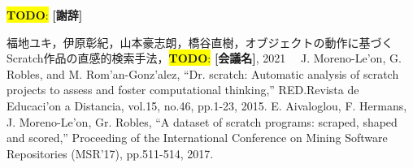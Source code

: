 \documentclass[uplatex,dvipdfmx,a4paper,twocolumn,base=11pt,jbase=11pt,ja=standard]{bxjsarticle}  %
\newcommand{\todo}[1]{\colorbox{yellow}{{\bf TODO}:}{\color{red} {\textbf{[#1]}}}}
\begin{document}
\todo{謝辞}

\begin{thebibliography}{1}
   福地ユキ，伊原彰紀，山本豪志朗，橋谷直樹，オブジェクトの動作に基づくScratch作品の直感的検索手法，\todo{会議名}, 2021
  　J. Moreno-Le'on, G. Robles, and M. Rom'an-Gonz'alez, ``Dr. scratch: Automatic analysis of scratch projects to assess and foster computational thinking,'' RED.Revista de Educaci'on a Distancia, vol.15, no.46, pp.1-23, 2015.
   E. Aivaloglou, F. Hermans, J. Moreno-Le'on, Gr. Robles, ``A dataset of scratch programs: scraped, shaped and scored,'' Proceeding of the International Conference on Mining Software Repositories (MSR'17), pp.511-514, 2017. 

\end{thebibliography}





%
\end{document}
